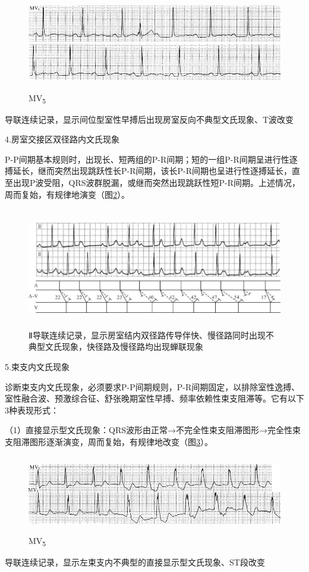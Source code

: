 \begin{figure}[!htbp]
 \centering
 \includegraphics[width=5.58333in,height=1.64583in]{./images/Image00306.jpg}
 \captionsetup{justification=centering}
 \caption{MV\textsubscript{5}}
 \label{fig18-5}
  \end{figure} 
导联连续记录，显示间位型室性早搏后出现房室反向不典型文氏现象、T波改变

4.房室交接区双径路内文氏现象

P-P间期基本规则时，出现长、短两组的P-R间期；短的一组P-R间期呈进行性逐搏延长，继而突然出现跳跃性长P-R间期，该长P-R间期也呈进行性逐搏延长，直至出现P波受阻，QRS波群脱漏，或继而突然出现跳跃性短P-R间期。上述情况，周而复始，有规律地演变（图\ref{fig18-6}）。

\begin{figure}[!htbp]
 \centering
 \includegraphics[width=5.78125in,height=2.0625in]{./images/Image00307.jpg}
 \captionsetup{justification=centering}
 \caption{Ⅱ导联连续记录，显示房室结内双径路传导伴快、慢径路同时出现不典型文氏现象，快径路及慢径路均出现蝉联现象}
 \label{fig18-6}
  \end{figure} 

5.束支内文氏现象

诊断束支内文氏现象，必须要求P-P间期规则，P-R间期固定，以排除室性逸搏、室性融合波、预激综合征、舒张晚期室性早搏、频率依赖性束支阻滞等。它有以下3种表现形式：

（1）直接显示型文氏现象：QRS波形由正常→不完全性束支阻滞图形→完全性束支阻滞图形逐渐演变，周而复始，有规律地改变（图\ref{fig18-7}）。

\begin{figure}[!htbp]
 \centering
 \includegraphics[width=5.58333in,height=1.33333in]{./images/Image00308.jpg}
 \captionsetup{justification=centering}
 \caption{MV\textsubscript{5}}
 \label{fig18-7}
  \end{figure} 
导联连续记录，显示左束支内不典型的直接显示型文氏现象、ST段改变

